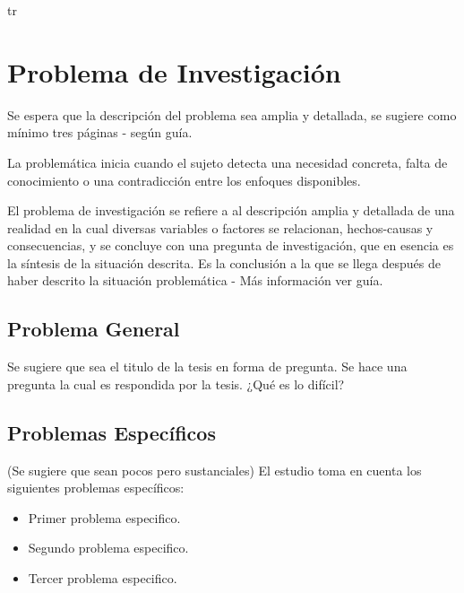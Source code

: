 tr\chapter{Problema de Investigación}
Se espera que la descripción del problema sea amplia y detallada, se sugiere como mínimo tres páginas - según guía.

La problemática inicia cuando el sujeto detecta una necesidad concreta, falta de conocimiento o una contradicción entre los enfoques disponibles.

El problema de investigación se refiere a al descripción amplia y detallada de una realidad en la cual diversas variables o factores se relacionan, hechos-causas y consecuencias, y se concluye con una pregunta de investigación, que en esencia es la síntesis de la situación descrita. Es la conclusión a la que se llega después de haber descrito la situación problemática - Más información ver guía.

\section{Problema General}
Se sugiere que sea el titulo de la tesis en forma de pregunta. Se hace una pregunta la cual es respondida por la tesis. ¿Qué es lo difícil?


\section{Problemas Específicos}
(Se sugiere que sean pocos pero sustanciales)
El estudio toma en cuenta los siguientes problemas específicos:
\begin{itemize}
	\item Primer problema especifico.
	\item Segundo problema especifico.
	\item Tercer problema especifico.	
\end{itemize}
